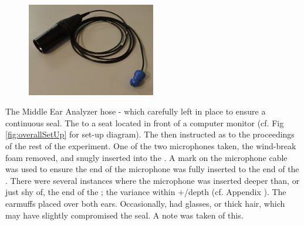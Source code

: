 \begin{figure}
\includegraphics[width=0.5\textwidth]{figure/micInsertPlug.JPG}
\caption{}
\label{fig:earmuffSetup}
\end{figure}

\DIFaddend The Middle Ear Analyzer hose \DIFdelbegin {}\DIFdelend \DIFaddbegin {}\DIFaddend - which \DIFdelbegin {}\DIFdelend \DIFaddbegin {}\DIFaddend carefully left in place to ensure a continuous seal.  The \DIFdelbegin {}\DIFdelend \DIFaddbegin {}\DIFaddend to a seat located in front of a computer monitor (cf. Fig \ref{fig:overallSetUp} for set-up diagram).  The \DIFdelbegin {}\DIFdelend \DIFaddbegin {}\DIFaddend then instructed as to the proceedings of the rest of the experiment. One of the two microphones \DIFdelbegin {}\DIFdelend \DIFaddbegin {}\DIFaddend taken, the wind-break foam removed, and \DIFdelbegin {}\DIFdelend \DIFaddbegin {}\DIFaddend snugly inserted into the \DIFdelbegin {}\DIFdelend \DIFaddbegin {}\DIFaddend .  A mark on the microphone cable was used to ensure the end of the microphone was fully inserted to the end of the \DIFdelbegin {}\DIFdelend \DIFaddbegin {}\DIFaddend .  There were several instances where the microphone was inserted deeper than, or just shy of, the end of the \DIFdelbegin {}\DIFdelend \DIFaddbegin {}\DIFaddend ; the variance \DIFdelbegin {}\DIFdelend \DIFaddbegin {}\DIFaddend within +/\DIFdelbegin \DIFdel{-1mm }\DIFdelend \DIFaddbegin \DIFadd{-2mm }\DIFaddend depth (cf. Appendix \DIFdelbegin {}\DIFdelend \DIFaddbegin {}\DIFaddend ).  The earmuffs \DIFdelbegin {}\DIFdelend \DIFaddbegin {}\DIFaddend placed over both ears.  Occasionally, \DIFdelbegin {}\DIFdelend \DIFaddbegin {}\DIFaddend had glasses, or thick hair, which may have slightly compromised the seal.  A note was taken of this. 

